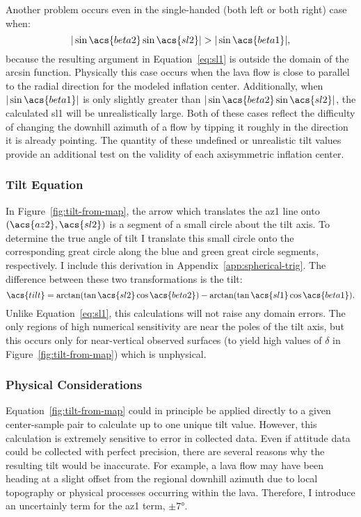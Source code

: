 Another problem occurs even in the single-handed (both left or both right) case when:
\begin{equation}
     |\sin\acs{beta2}\sin\acs{sl2}| > |\sin\acs{beta1}|,\label{eq:domain-error}
\end{equation}
because the resulting argument in Equation~\eqref{eq:sl1} is outside the domain of the arcsin function. Physically this case occurs when the lava flow is close to parallel to the radial direction for the modeled inflation center. Additionally, when $|\sin\acs{beta1}|$ is only slightly greater than $|\sin\acs{beta2}\sin\acs{sl2}|$, the calculated \acs{sl1} will be unrealistically large. Both of these cases reflect the difficulty of changing the downhill azimuth of a flow by tipping it roughly in the direction it is already pointing. The quantity of these undefined or unrealistic tilt values provide an additional test on the validity of each axisymmetric inflation center.

\subsubsection{Tilt Equation}

In Figure~\ref{fig:tilt-from-map}, the arrow which translates the \acs{az1} line onto $\left(\acs{az2},\acs{sl2}\right)$ is a segment of a small circle about the tilt axis. To determine the true angle of tilt I translate this small circle onto the corresponding great circle along the blue and green great circle segments, respectively. I include this derivation in Appendix~\ref{app:spherical-trig}. The difference between these two transformations is the tilt: 
\begin{equation}
    \acs{tilt} = \arctan(\tan\acs{sl2}\cos\acs{beta2}) - \arctan(\tan\acs{sl1}\cos\acs{beta1}).\label{eq:tilt-from-map}
\end{equation}
Unlike Equation~\eqref{eq:sl1}, this calculations will not raise any domain errors. The only regions of high numerical sensitivity are near the poles of the tilt axis, but this occurs only for near-vertical observed surfaces (to yield high values of $\delta$ in Figure~\ref{fig:tilt-from-map}) which is unphysical.

\subsubsection{Physical Considerations}

Equation~\eqref{fig:tilt-from-map} could in principle be applied directly to a given center-sample pair to calculate up to one unique tilt value. However, this calculation is extremely sensitive to error in collected data. Even if attitude data could be collected with perfect precision, there are several reasons why the resulting tilt would be inaccurate. For example, a lava flow may have been heading at a slight offset from the regional downhill azimuth due to local topography or physical processes occurring within the lava. Therefore, I introduce an uncertainly term for the \acs{az1} term, $\pm\ang{7}$. 

